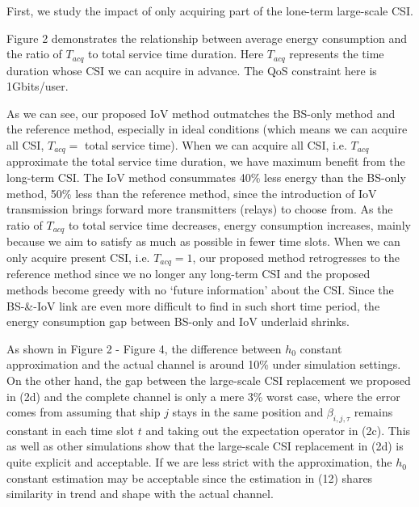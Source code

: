 \documentclass[conference]{IEEEtran}
\begin{document}

First, we study the impact of only acquiring part of the lone-term large-scale CSI. 

Figure 2 demonstrates the relationship between average energy consumption and the ratio of ${T_{acq}}$ to total service time duration. Here ${T_{acq}}$ represents the time duration whose CSI we can acquire in advance. The QoS constraint here is 1Gbits/user. 

As we can see, our proposed IoV method outmatches the BS-only method and the reference method, especially in ideal conditions (which means we can acquire all CSI, ${T_{acq}}=$ total service time). %
When we can acquire all CSI, i.e. ${T_{acq}}$ approximate the total service time duration, we have maximum benefit from the long-term CSI. The IoV method consummates 40\% less energy than the BS-only method, 50\% less than the reference method, since the introduction of IoV transmission brings forward more transmitters (relays) to choose from. As the ratio of ${T_{acq}}$ to total service time decreases, %
energy consumption increases, mainly because we aim to satisfy as much as possible in fewer time slots. When we can only acquire present CSI, i.e. ${T_{acq}} = 1$, our proposed method retrogresses to the reference method since we no longer any long-term CSI and the proposed methods become greedy with no `future information' about the CSI. Since the BS-\&-IoV link are even more difficult to find in such short time period, the energy consumption gap between BS-only and IoV underlaid shrinks.  

As shown in Figure 2 - Figure 4, the difference between ${h_0}$ constant approximation and the actual channel is around 10\% under simulation settings. On the other hand, the gap between the large-scale CSI replacement we proposed in (2d) and the complete channel is only a mere 3\% worst case, where the error comes from assuming that ship $j$ stays in the same position and $\beta _{i,j,\tau }$ remains constant in each time slot $t$ and taking out the expectation operator in (2c). This as well as other simulations show that the large-scale CSI replacement in (2d) is quite explicit and acceptable. If we are less strict with the approximation, the ${h_0}$ constant estimation may be acceptable since the estimation in (12) shares similarity in trend and shape with the actual channel. 
\end{document}
